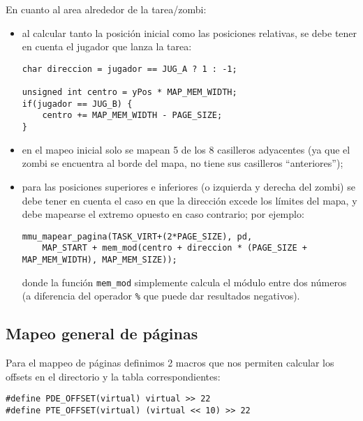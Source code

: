 	En cuanto al area alrededor de la tarea/zombi:

	\begin{itemize}
		\item al calcular tanto la posición inicial como las posiciones relativas, se debe tener en cuenta el jugador que lanza la tarea:

		\lstset{escapechar=@,style=c}
		\begin{lstlisting}
char direccion = jugador == JUG_A ? 1 : -1;

unsigned int centro = yPos * MAP_MEM_WIDTH;
if(jugador == JUG_B) {
	centro += MAP_MEM_WIDTH - PAGE_SIZE;
}
		\end{lstlisting}

		\item en el mapeo inicial solo se mapean 5 de los 8 casilleros adyacentes (ya que el zombi se encuentra al borde del mapa, no tiene sus casilleros ``anteriores'');

		\item para las posiciones superiores e inferiores (o izquierda y derecha del zombi) se debe tener en cuenta el caso en que la dirección excede los límites del mapa, y debe mapearse el extremo opuesto en caso contrario; por ejemplo:

		\begin{lstlisting}
mmu_mapear_pagina(TASK_VIRT+(2*PAGE_SIZE), pd,
	MAP_START + mem_mod(centro + direccion * (PAGE_SIZE + MAP_MEM_WIDTH), MAP_MEM_SIZE));
		\end{lstlisting}

		donde la función \texttt{mem\_mod} simplemente calcula el módulo entre dos números (a diferencia del operador \verb|%| que puede dar resultados negativos).

	\end{itemize}

	\subsection{Mapeo general de páginas}

	Para el mappeo de páginas definimos 2 macros que nos permiten calcular los offsets en el directorio y la tabla correspondientes:

	\begin{lstlisting}
#define PDE_OFFSET(virtual) virtual >> 22
#define PTE_OFFSET(virtual) (virtual << 10) >> 22
	\end{lstlisting}

